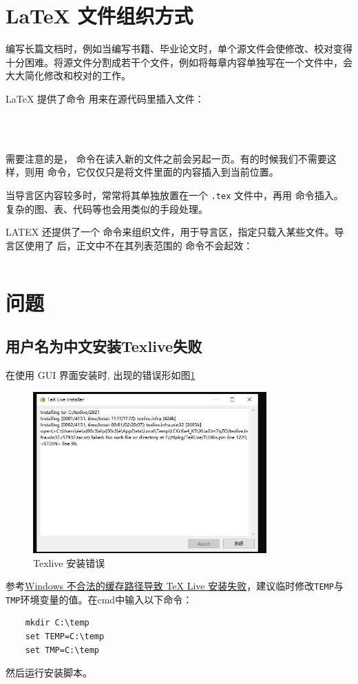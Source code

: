 \section{\LaTeX{} 文件组织方式}\label{sec:latexfileorganization}

编写长篇文档时，例如当编写书籍、毕业论文时，单个源文件会使修改、校对变得十分困难。将源文件分割成若干个文件，例如将每章内容单独写在一个文件中，会大大简化修改和校对的工作。

\LaTeX{} 提供了命令 \lstinline{} 用来在源代码里插入文件：

\begin{lstlisting}



\end{lstlisting}

需要注意的是，\lstinline{} 命令在读入新的文件之前会另起一页。有的时候我们不需要这样，则用\lstinline{} 命令，它仅仅只是将文件里面的内容插入到当前位置。

当导言区内容较多时，常常将其单独放置在一个 \lstinline{.tex} 文件中，再用 \lstinline{} 命令插入。复杂的图、表、代码等也会用类似的手段处理。

LATEX 还提供了一个 \lstinline{} 命令来组织文件，用于导言区，指定只载入某些文件。导言区使用了 \lstinline{} 后，正文中不在其列表范围的 \lstinline{}命令不会起效：
\begin{lstlisting}

\end{lstlisting}

\section{问题}
\subsection{用户名为中文安装Texlive失败}\label{subsec:texlive_cn_username}
在使用 GUI 界面安装时, 出现的错误形如图\ref{fig:failuregui}
\begin{figure}[!h]
    \centering
    \includegraphics[width=0.8\textwidth]{figure/chap-basic/failuregui.jpg}
    \caption{Texlive 安装错误}\label{fig:failuregui}
\end{figure}

参考\href{https://syvshc.github.io/2021-04-07-illegal-temp-cause-tlinstall-failure/}{Windows 不合法的缓存路径导致 TeX Live 安装失败}，建议临时修改\lstinline{TEMP}与\lstinline{TMP}环境变量的值。在cmd中输入以下命令：
\begin{lstlisting}
    mkdir C:\temp
    set TEMP=C:\temp
    set TMP=C:\temp
\end{lstlisting}

然后运行安装脚本。